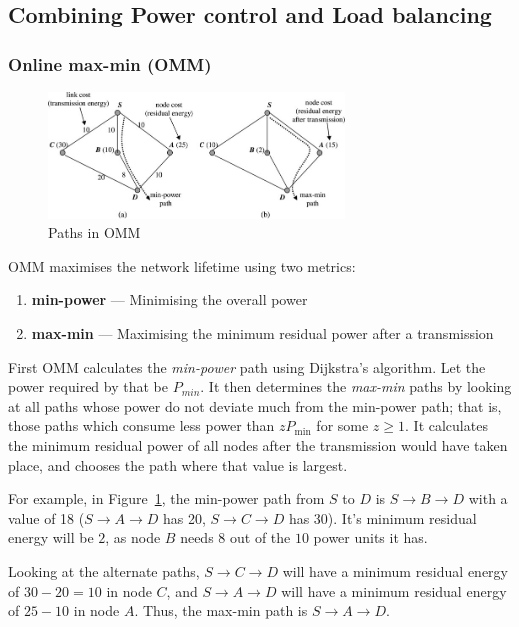 
\subsection{Combining Power control and Load balancing}

\subsubsection{Online max-min (OMM)}
\begin{figure}
\centering
\includegraphics[width=0.7\textwidth]{images/omm}
\caption{Paths in OMM\cite{alotaibi2012survey}}
\label{ommex}
\end{figure}
\label{omm}
OMM \cite{li2001online} maximises the network lifetime using two metrics:
\begin{enumerate}
  \item \textbf{min-power} --- Minimising the overall power
  \item \textbf{max-min} --- Maximising the minimum residual power after a transmission
\end{enumerate}

First OMM calculates the \textit{min-power} path using Dijkstra’s algorithm. Let
the power required by that be $P_{min}$.
It then determines the \textit{max-min} paths by looking at all paths whose
power do not deviate much from the min-power path; that is, those paths which consume less
power than $zP_{\min}$ for some $z \ge 1$. It calculates the minimum residual power of all nodes
after the transmission would have taken place, and chooses the path where
that value is largest.

For example, in Figure~\ref{ommex}, the min-power path from
$S$ to $D$ is $S \to B \to D$ with a value of 18 ($S \to A \to D$ has 20,
$S \to C \to D$ has 30).
It's minimum residual energy will be $2$, as node $B$ needs
$8$ out of the $10$ power units it has.

Looking at the alternate paths, $S \to C \to D$ will have a
minimum residual energy of $30-20=10$ in node $C$, and $S \to A \to D$ will
have a minimum residual energy of $25-10$ in node $A$.
Thus, the max-min path is $S \to A \to D$.

